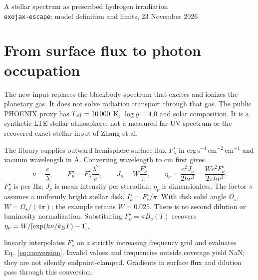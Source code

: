 \documentclass[10pt,a4paper]{article}
\begin{document}
\begin{center}
{\Large A stellar spectrum as prescribed hydrogen irradiation}\\[4pt]
\texttt{exojax-escape}: model definition and limits, 23 November 2026
\end{center}

\section{From surface flux to photon occupation}
The new input replaces the blackbody spectrum that excites and ionizes the
planetary gas. It does not solve radiation transport through that gas.
The public PHOENIX proxy has $T_{\rm eff}=10\,000$ K, $\log g=4.0$ and
solar composition. It is a synthetic LTE stellar atmosphere, not a measured
far-UV spectrum or the recovered exact stellar input of Zhang et al.

The library supplies outward-hemisphere surface flux
$F_\lambda^{\star}$ in erg\,s$^{-1}$\,cm$^{-2}$\,cm$^{-1}$ and vacuum
wavelength in \AA. Converting wavelength to cm first gives
\begin{equation}
 \nu=\frac{c}{\lambda},\qquad
 F_\nu^{\star}=F_\lambda^{\star}\frac{\lambda^2}{c},\qquad
 J_\nu=W\frac{F_\nu^{\star}}{\pi},\qquad
 \eta_\nu=\frac{c^2J_\nu}{2h\nu^3}
         =\frac{Wc^2F_\nu^{\star}}{2\pi h\nu^3}.
 \tag{SED-1}\label{eq:conversion}
\end{equation}
$F_\nu^{\star}$ is per Hz; $J_\nu$ is mean intensity per steradian;
$\eta_\nu$ is dimensionless. The factor $\pi$ assumes a uniformly bright
stellar disk, $I_\nu^{\star}=F_\nu^{\star}/\pi$. With disk solid angle
$\Omega_\star$, $W=\Omega_\star/(4\pi)$; the example retains $W=0.025$.
There is no second dilution or luminosity normalization. Substituting
$F_\nu^{\star}=\pi B_\nu(T)$ recovers
$\eta_\nu=W/[\exp(h\nu/k_{\rm B}T)-1]$.

 linearly
interpolates $F_\nu^{\star}$ on a strictly increasing frequency grid and
evaluates Eq.~\eqref{eq:conversion}. Invalid values and frequencies outside
coverage yield NaN; they are not silently endpoint-clamped. Gradients in
surface flux and dilution pass through this conversion.
\end{document}
